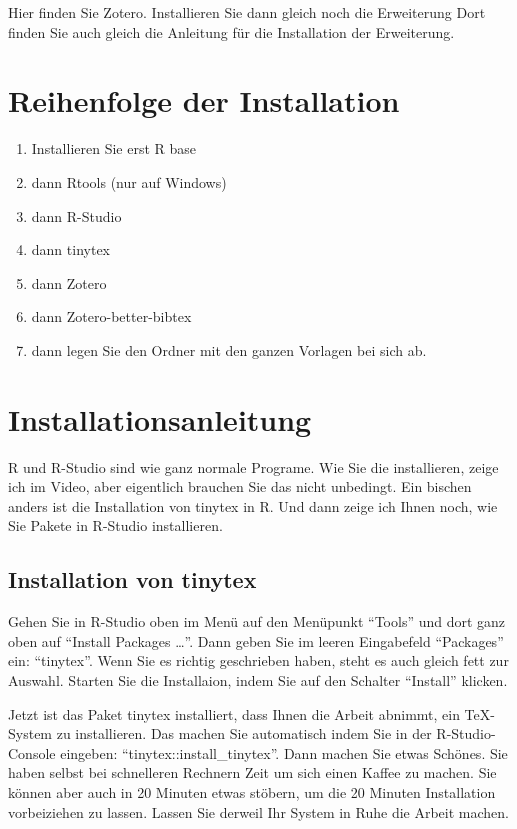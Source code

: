 \documentclass[twoside, pagesize, fontsize=11pt, dvipsnames]{scrreport}
\providecommand{\tightlist}{%
  \setlength{\itemsep}{0pt}\setlength{\parskip}{0pt}}
\begin{document}
Hier finden Sie Zotero. Installieren Sie dann gleich noch die
Erweiterung Dort finden Sie auch gleich die Anleitung für die
Installation der Erweiterung.

\hypertarget{reihenfolge-der-installation}{%
\section{Reihenfolge der
Installation}\label{reihenfolge-der-installation}}

\begin{enumerate}
\def\labelenumi{\arabic{enumi}.}
\tightlist
\item
  Installieren Sie erst R base
\item
  dann Rtools (nur auf Windows)
\item
  dann R-Studio
\item
  dann tinytex
\item
  dann Zotero
\item
  dann Zotero-better-bibtex
\item
  dann legen Sie den Ordner mit den ganzen Vorlagen bei sich ab.
\end{enumerate}

\hypertarget{installationsanleitung}{%
\section{Installationsanleitung}\label{installationsanleitung}}

R und R-Studio sind wie ganz normale Programe. Wie Sie die installieren,
zeige ich im Video, aber eigentlich brauchen Sie das nicht unbedingt.
Ein bischen anders ist die Installation von tinytex in R. Und dann zeige
ich Ihnen noch, wie Sie Pakete in R-Studio installieren.

\hypertarget{installation-von-tinytex}{%
\subsection{Installation von tinytex}\label{installation-von-tinytex}}

Gehen Sie in R-Studio oben im Menü auf den Menüpunkt \enquote{Tools} und
dort ganz oben auf \enquote{Install Packages \ldots{}}. Dann geben Sie
im leeren Eingabefeld \enquote{Packages} ein: \enquote{tinytex}. Wenn
Sie es richtig geschrieben haben, steht es auch gleich fett zur Auswahl.
Starten Sie die Installaion, indem Sie auf den Schalter
\enquote{Install} klicken.

Jetzt ist das Paket tinytex installiert, dass Ihnen die Arbeit abnimmt,
ein TeX-System zu installieren. Das machen Sie automatisch indem Sie in
der R-Studio-Console eingeben: \enquote{tinytex::install\_tinytex}. Dann
machen Sie etwas Schönes. Sie haben selbst bei schnelleren Rechnern Zeit
um sich einen Kaffee zu machen. Sie können aber auch in 20 Minuten etwas
stöbern, um die 20 Minuten Installation vorbeiziehen zu lassen. Lassen
Sie derweil Ihr System in Ruhe die Arbeit machen.
\end{document}

